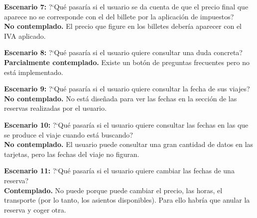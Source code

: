\textbf{Escenario 7:} ?`Qué pasaría si el usuario se da cuenta de que el precio final que aparece no se corresponde con el del billete por la aplicación de impuestos? \\
\textbf{No contemplado.} El precio que figure en los billetes debería aparecer con el IVA aplicado.

\textbf{Escenario 8:} ?`Qué pasaría si el usuario quiere consultar una duda concreta? \\
\textbf{Parcialmente contemplado.} Existe un botón de preguntas frecuentes pero no está implementado.

\textbf{Escenario 9:} ?`Qué pasaría si el usuario quiere consultar la fecha de sus viajes? \\
\textbf{No contemplado.} No está diseñada para ver las fechas en la sección de las reservas realizadas por el usuario.

\textbf{Escenario 10:} ?`Qué pasaría si el usuario quiere consultar las fechas en las que se produce el viaje cuando está buscando? \\
\textbf{No contemplado.} El usuario puede consultar una gran cantidad de datos en las tarjetas, pero las fechas del viaje no figuran.

\textbf{Escenario 11:} ?`Qué pasaría si el usuario quiere cambiar las fechas de una reserva? \\
\textbf{Contemplado.} No puede porque puede cambiar el precio, las horas, el transporte (por lo tanto, los asientos disponibles). Para ello habría que anular la reserva y coger otra.